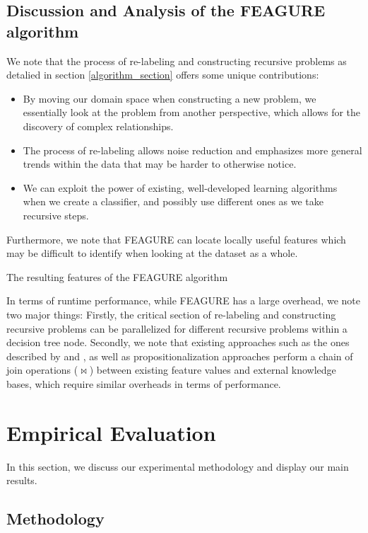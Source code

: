 \documentclass[twoside,11pt]{article}
\theoremstyle{definition}
\begin{document}
\subsection{Discussion and Analysis of the FEAGURE algorithm}
We note that the process of re-labeling and constructing recursive problems as detalied in section \ref{algorithm_section} offers some unique contributions:
\begin{itemize}
	\item By moving our domain space when constructing a new problem, we essentially look at the problem from another perspective, which allows for the discovery of complex relationships.
	\item The process of re-labeling allows noise reduction and emphasizes more general trends within the data that may be harder to otherwise notice.
	\item We can exploit the power of existing, well-developed learning algorithms when we create a classifier, and possibly use different ones as we take recursive steps.
\end{itemize}
Furthermore, we note that FEAGURE can locate locally useful features which may be difficult to identify when looking at the dataset as a whole.

The resulting features of the FEAGURE algorithm %

In terms of runtime performance, while FEAGURE has a large overhead, we note two major things: Firstly, the critical section of re-labeling and constructing recursive problems can be parallelized for different recursive problems within a decision tree node.
Secondly, we note that existing approaches such as the ones described by   and , as well as propositionalization approaches %
perform a chain of join operations ($\Join$) between existing feature values and external knowledge bases, which require similar overheads in terms of performance.

\section{Empirical Evaluation}
In this section, we discuss our experimental methodology and display our main results.
\subsection{Methodology}
\end{document}
